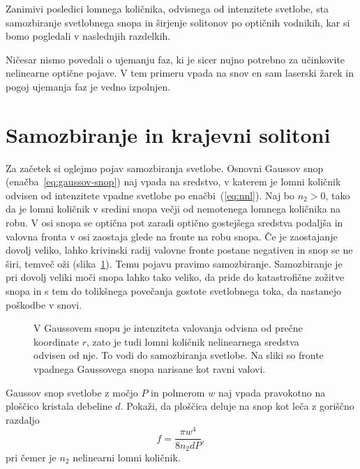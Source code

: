 Zanimivi posledici lomnega količnika, odvisnega od intenzitete svetlobe, 
sta samozbiranje svetlobnega snopa in širjenje solitonov po optičnih vodnikih, 
kar si bomo pogledali v naslednjih
razdelkih.

\begin{remark}
Ničesar nismo povedali o ujemanju faz, ki je sicer nujno potrebno za učinkovite nelinearne 
optične pojave. V tem primeru vpada na snov en sam laserski žarek in pogoj ujemanja faz
je vedno izpolnjen. 
\end{remark}

\section{Samozbiranje in krajevni solitoni}
Za začetek si oglejmo pojav samozbiranja svetlobe. Osnovni Gaussov snop 
(enačba~\ref{eq:gaussov-snop}) naj vpada na sredstvo,
v katerem je lomni količnik odvisen od intenzitete vpadne svetlobe po enačbi~(\ref{eq:nnl}).
Naj bo $n_{2}>0$, tako da je lomni količnik v sredini snopa večji 
od nemotenega lomnega količnika na robu. V osi snopa se optična pot 
zaradi optično gostejšega sredstva podaljša in valovna fronta 
v osi zaostaja glede na fronte na robu snopa. Če je zaostajanje dovolj veliko,
lahko krivinski radij valovne fronte postane negativen in snop se
ne širi, temveč oži (slika~\ref{fig:sf1}). Temu pojavu pravimo 
samozbiranje. Samozbiranje je pri dovolj
veliki moči snopa lahko tako veliko, da pride do katastrofične zožitve snopa
in s tem do tolikšnega povečanja gostote svetlobnega toka, da nastanejo
poškodbe v snovi.
\begin{figure}[h]
\centering
\def\svgwidth{100truemm} 

\caption{V Gaussovem snopu je intenziteta valovanja odvisna od prečne koordinate $r$, 
zato je tudi lomni količnik nelinearnega sredstva odvisen od nje. To vodi do 
 samozbiranja svetlobe. Na sliki so fronte vpadnega Gaussovega snopa narisane kot ravni valovi.}
\label{fig:sf1}
\end{figure}

\begin{definition}
Gaussov snop svetlobe z močjo $P$ in polmerom $w$ naj vpada pravokotno na ploščico
kristala debeline $d$. Pokaži, da ploščica deluje na snop kot leča z goriščno razdaljo 
\begin{equation}
f = \frac{\pi w^4}{8 n_2 d P},
\end{equation}
pri čemer je $n_2$ nelinearni lomni količnik.
\end{definition}


